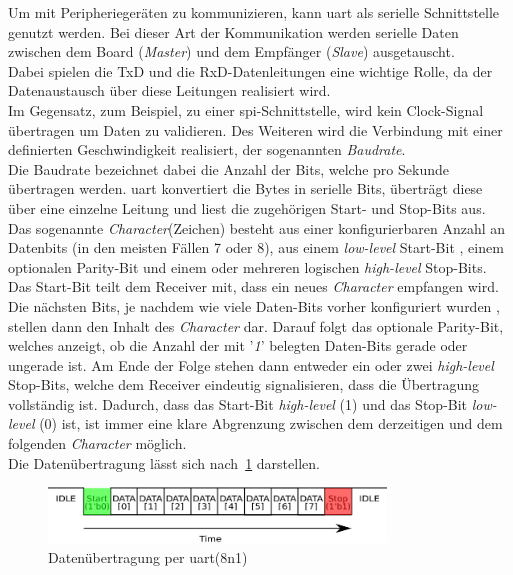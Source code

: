 Um mit Peripheriegeräten zu kommunizieren, kann \ac{uart} als serielle Schnittstelle genutzt werden.
Bei dieser Art der Kommunikation werden serielle Daten zwischen dem Board (\emph{Master})
und dem Empfänger (\emph{Slave}) ausgetauscht. \\
Dabei spielen die TxD und die RxD-Datenleitungen
eine wichtige Rolle, da der Datenaustausch über diese Leitungen realisiert wird.\\
Im Gegensatz, zum Beispiel, zu einer \ac{spi}-Schnittstelle, wird kein Clock-Signal
übertragen um Daten zu validieren. Des Weiteren wird die Verbindung mit einer definierten
Geschwindigkeit realisiert, der sogenannten \emph{Baudrate}. \cite{uartpdf} \\
Die Baudrate bezeichnet dabei die Anzahl der Bits, welche pro Sekunde übertragen werden.
\ac{uart} konvertiert die Bytes in serielle Bits, überträgt diese über eine einzelne Leitung
und liest die zugehörigen Start- und Stop-Bits aus.\\
Das sogenannte \emph{Character}(Zeichen) besteht aus einer konfigurierbaren Anzahl an Datenbits (in den meisten
Fällen 7 oder 8), aus einem \emph{low-level} Start-Bit , einem optionalen Parity-Bit und einem
oder mehreren logischen \emph{high-level} Stop-Bits.\\
Das Start-Bit teilt dem Receiver mit, dass ein neues \emph{Character} empfangen wird.
Die nächsten Bits, je nachdem wie viele Daten-Bits vorher konfiguriert wurden , stellen
dann den Inhalt des \emph{Character} dar. Darauf folgt das optionale Parity-Bit,
welches anzeigt, ob die Anzahl der mit '\emph{1}' belegten Daten-Bits gerade oder
ungerade ist. Am Ende der Folge stehen dann entweder ein oder zwei  \emph{high-level } Stop-Bits,
welche dem Receiver eindeutig signalisieren, dass die Übertragung vollständig ist. Dadurch,
dass das Start-Bit \emph{high-level} (1) und das Stop-Bit \emph{low-level} (0) ist,
ist immer eine klare Abgrenzung zwischen dem derzeitigen und dem folgenden \emph{Character} möglich.\\

Die Datenübertragung lässt sich nach~\ref{fig:uart} darstellen.\\

\begin{figure}[h!]
\centering
\includegraphics[width=0.8\textwidth]{Hauptteil/uart.eps}
\caption{Datenübertragung per \ac{uart}(8n1) }
\label{fig:uart}
\end{figure}


